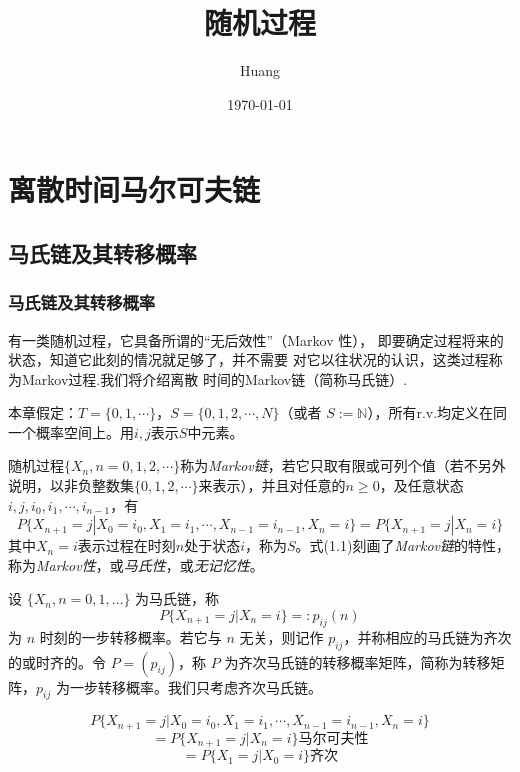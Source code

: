 \documentclass[lang=cn,10pt,thmcnt=section]{elegantbook}
\title{随机过程}
\author{Huang}
\date{\today}
\begin{document}
	
	\maketitle
	\frontmatter
	
	\tableofcontents
	
	\mainmatter
	\chapter{离散时间马尔可夫链}
	\section{马氏链及其转移概率}
	\subsection{马氏链及其转移概率}
	有一类随机过程，它具备所谓的“无后效性”（Markov 性），
即要确定过程将来的状态，知道它此刻的情况就足够了，并不需要
对它以往状况的认识，这类过程称为Markov过程.我们将介绍离散
时间的Markov链（简称马氏链）.

本章假定：$T = \{0, 1, \cdots\}$，$S = \{0, 1, 2, \cdots, N\}$（或者 $S := \mathbb{N}$），所有r.v.均定义在同一个概率空间上。用$i, j$表示$S$中元素。
\begin{definition}[离散时间马尔可夫链]
	随机过程$\{X_n, n = 0, 1, 2, \cdots\}$称为\textit{Markov链}，若它只取有限或可列个值（若不另外说明，以非负整数集$\{0, 1, 2, \cdots\}$来表示），并且对任意的$n \geq 0$，及任意状态$i, j, i_0, i_1, \cdots, i_{n-1}$，有
\begin{equation}
P\{X_{n+1} = j | X_0 = i_0, X_1 = i_1, \cdots, X_{n-1} = i_{n-1}, X_n = i\} = P\{X_{n+1} = j | X_n = i\}
\end{equation}
其中$X_n = i$表示过程在时刻$n$处于状态$i$，称为$S$。式(1.1)刻画了\textit{Markov链}的特性，称为\textit{Markov性}，或\textit{马氏性}，或\textit{无记忆性}。
\end{definition}

\begin{definition}[转移概率]
	设 $\{X_n, n = 0, 1, \ldots\}$ 为马氏链，称
\[ P\{X_{n+1} = j | X_n = i\} =: p_{ij}(n) \]
为 $n$ 时刻的一步转移概率。若它与 $n$ 无关，则记作 $p_{ij}$，并称相应的马氏链为齐次的或时齐的。令 $P = (p_{ij})$，称 $P$ 为齐次马氏链的转移概率矩阵，简称为转移矩阵，$p_{ij}$ 为一步转移概率。我们只考虑齐次马氏链。

\end{definition}

\[ P\{X_{n+1} = j | X_0 = i_0, X_1 = i_1, \cdots, X_{n-1} = i_{n-1}, X_n = i\} \]
\[ = P\{X_{n+1} = j | X_n = i\} \text{马尔可夫性} \]
\[ = P\{X_1 = j | X_0 = i\} \text{齐次} \]
\end{document}
